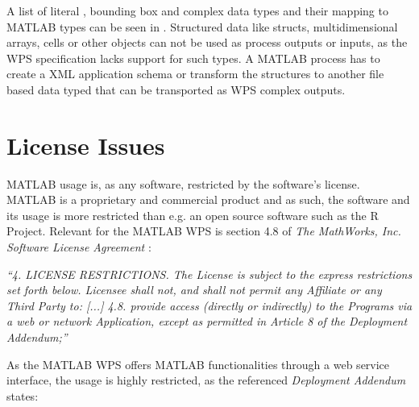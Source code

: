		A list of literal \citep[based on][]{w3c:xmldatatypes}, bounding box and complex data types and their mapping to MATLAB types can be seen in . Structured data like structs, multidimensional arrays, cells or other objects can not be used as process outputs or inputs, as the \ac{WPS} specification lacks support for such types. A MATLAB process has to create a XML application schema or transform the structures to another file based data typed that can be transported as WPS complex outputs.

	\section{License Issues}
		MATLAB usage is, as any software, restricted by the software's license. MATLAB is a proprietary and commercial product and as such, the software and its usage is more restricted than e.g. an open source software such as the R Project. Relevant for the MATLAB WPS is section 4.8 of \emph{The MathWorks, Inc. Software License Agreement} \citep{matlablicense}:
		\begin{xquote}\itshape\small
			``4. LICENSE RESTRICTIONS.  The License is subject to the express restrictions
			set forth below. Licensee shall not, and shall not permit any Affiliate or any
			Third Party to:
				[...]
				4.8. provide access (directly or indirectly) to the Programs via a web or
				network Application, except as permitted in Article 8 of the Deployment
				Addendum;''
		\end{xquote}

		As the MATLAB WPS offers MATLAB functionalities through a web service interface, the usage is highly restricted, as the referenced \emph{Deployment Addendum} \citep{matlablicense} states:

